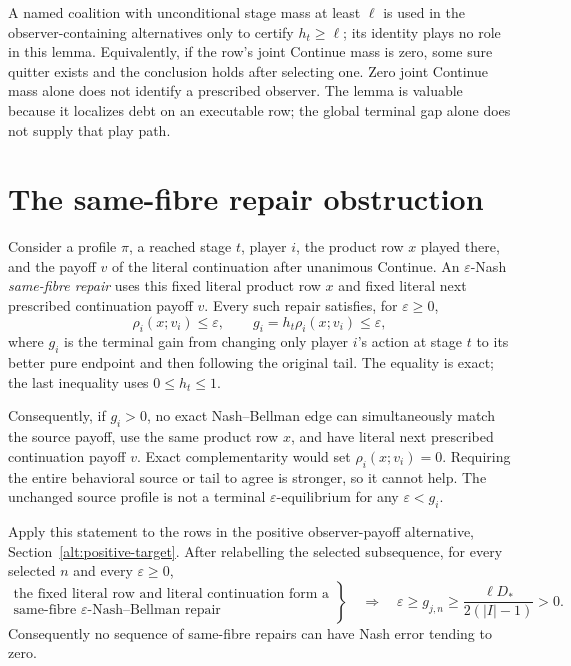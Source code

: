 \documentclass[11pt]{article}
\begin{document}
A named coalition with unconditional stage mass at least $\ell$ is used in
the observer-containing alternatives only to certify $h_t\ge\ell$; its identity plays
no role in this lemma.  Equivalently, if the row's joint Continue mass is
zero, some sure quitter exists and the conclusion holds after selecting one.
Zero joint Continue mass alone does not identify a prescribed observer.  The
lemma is valuable because it localizes debt on an executable row; the global
terminal gap alone does not supply that play path.

\section{The same-fibre repair obstruction}
\label{sec:same-fibre}

Consider a profile $\pi$, a reached stage $t$, player $i$, the product row
$x$ played there, and the payoff $v$ of the literal continuation after
unanimous Continue.  An $\varepsilon$-Nash \emph{same-fibre repair} uses this
fixed literal product row $x$ and fixed literal next prescribed continuation
payoff $v$.  Every such repair satisfies, for $\varepsilon\ge0$,
\begin{equation}
\label{eq:same-fibre-bound}
 \rho_i(x;v_i)\le\varepsilon,
 \qquad
 \boxed{g_i=h_t\rho_i(x;v_i)\le\varepsilon,}
\end{equation}
where $g_i$ is the terminal gain from changing only player $i$'s action at
stage $t$ to its better pure endpoint and then following the original tail.
The equality is exact; the last inequality uses $0\le h_t\le1$.

Consequently, if $g_i>0$, no exact Nash--Bellman edge can simultaneously
match the source payoff, use the same product row $x$, and have literal next
prescribed continuation payoff $v$.
Exact complementarity would set $\rho_i(x;v_i)=0$.  Requiring the entire
behavioral source or tail to agree is stronger, so it cannot help.  The
unchanged source profile is not a terminal $\varepsilon$-equilibrium for
any $\varepsilon<g_i$.

Apply this statement to the rows in the positive observer-payoff alternative,
Section~\ref{alt:positive-target}.  After relabelling the selected
subsequence, for every selected $n$ and every $\varepsilon\ge0$,
\begin{equation}
\label{eq:positive-target-repair-floor}
 \left.
 \begin{array}{c}
 \text{the fixed literal row and literal continuation form a}\\
 \text{same-fibre }\varepsilon\text{-Nash--Bellman repair}
 \end{array}
 \right\}
 \quad\Longrightarrow\quad
 \boxed{
 \varepsilon\ge g_{j,n}\ge
   \frac{\ell D_*}{2(|I|-1)}>0.}
\end{equation}
Consequently no sequence of same-fibre repairs can have Nash error tending
to zero.
\end{document}
